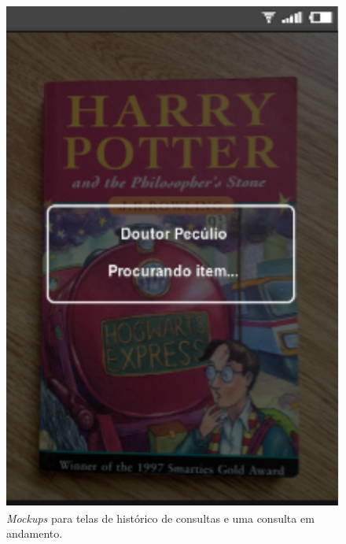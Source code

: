 \begin{figure}[ht]
\begin{minipage}{.5\textwidth}
            \includegraphics[scale=1]{tela/TelaBuscando}
        \end{minipage}
        \caption{ \label{fig:TelaHistorico} \textit{Mockups} para telas de 
            histórico de consultas e uma consulta em andamento. }


\end{figure}
